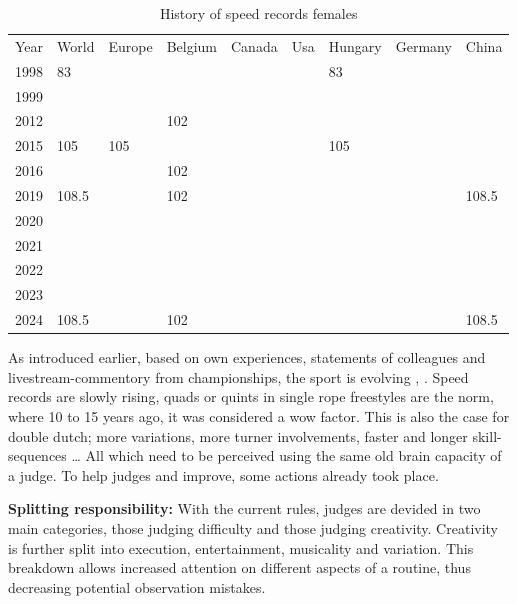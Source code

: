 \begin{table}[]
    \begin{tabular}{lllllllll}
        Year & World & Europe & Belgium & Canada & Usa & Hungary & Germany & China \\
        1998 & 83    &        &         &        &     & 83      &         &       \\
        1999 &       &        &         &        &     &         &         &       \\
        2012 &       &        & 102     &        &     &         &         &       \\
        2015 & 105   & 105    &         &        &     & 105     &         &       \\
        2016 &       &        & 102     &        &     &         &         &       \\
        2019 & 108.5 &        & 102     &        &     &         &         & 108.5 \\
        2020 &       &        &         &        &     &         &         &       \\
        2021 &       &        &         &        &     &         &         &       \\
        2022 &       &        &         &        &     &         &         &       \\
        2023 &       &        &         &        &     &         &         &       \\
        2024 & 108.5 &        & 102     &        &     &         &         & 108.5
    \end{tabular}
    \caption{History of speed records females}
    \label{tbl:speed-records-female}
\end{table}

As introduced earlier, based on own experiences, statements of colleagues and livestream-commentory from championships, %
the sport is evolving \autocite{IJRU_yt_2023_livestream_day1}, \autocite{IJRU_yt_2023_livestream_day8}.
Speed records are slowly rising, quads or quints in single rope freestyles are the norm, where 10 to 15 years ago, it was considered a wow factor. This is also the case for double dutch; more variations, more turner involvements, faster and longer skill-sequences \dots
All which need to be perceived using the same old brain capacity of a judge.
To help judges and improve, some actions already took place. 

\textbf{Splitting responsibility:} With the current rules, judges are devided in two main categories, those judging difficulty and those judging creativity. Creativity is further split into execution, entertainment, musicality and variation. This breakdown allows increased attention on different aspects of a routine, thus decreasing potential observation mistakes.

